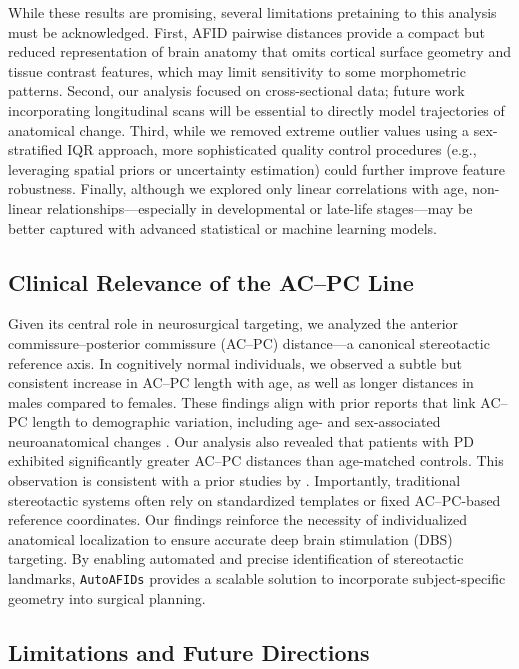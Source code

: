 While these results are promising, several limitations pretaining to this analysis must be acknowledged. First, AFID pairwise distances provide a compact but reduced representation of brain anatomy that omits cortical surface geometry and tissue contrast features, which may limit sensitivity to some morphometric patterns. Second, our analysis focused on cross-sectional data; future work incorporating longitudinal scans will be essential to directly model trajectories of anatomical change. Third, while we removed extreme outlier values using a sex-stratified IQR approach, more sophisticated quality control procedures (e.g., leveraging spatial priors or uncertainty estimation) could further improve feature robustness. Finally, although we explored only linear correlations with age, non-linear relationships—especially in developmental or late-life stages—may be better captured with advanced statistical or machine learning models.

\subsection{Clinical Relevance of the AC–PC Line}
Given its central role in neurosurgical targeting, we analyzed the anterior commissure–posterior commissure (AC–PC) distance—a canonical stereotactic reference axis. In cognitively normal individuals, we observed a subtle but consistent increase in AC–PC length with age, as well as longer distances in males compared to females. These findings align with prior reports that link AC–PC length to demographic variation, including age- and sex-associated neuroanatomical changes \cite{Lee2008-nd}. Our analysis also revealed that patients with PD exhibited significantly greater AC–PC distances than age-matched controls. This observation is consistent with a prior studies by \cite{Lee2008-nd,Dabadi2020-am}. Importantly, traditional stereotactic systems often rely on standardized templates or fixed AC–PC-based reference coordinates. Our findings reinforce the necessity of individualized anatomical localization to ensure accurate deep brain stimulation (DBS) targeting. By enabling automated and precise identification of stereotactic landmarks, \texttt{AutoAFIDs} provides a scalable solution to incorporate subject-specific geometry into surgical planning.

\subsection{Limitations and Future Directions}

